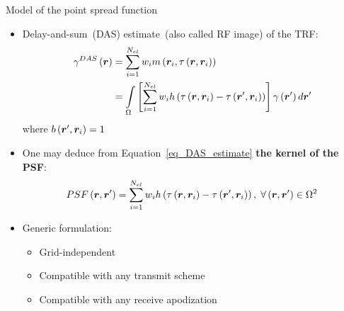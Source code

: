 {\begin{block}{Model of the point spread function}
	\begin{itemize}
		\item Delay-and-sum~(DAS) estimate~(also called RF image) of the TRF:
		\begin{align}
		\label{eq_DAS_estimate}
			\gamma^{DAS} \left(\bm{r}\right) &= \sum \limits_{i=1}^{N_{el}} w_i m \left(\bm{r}_i, \tau \left(\bm{r}, \bm{r}_i\right)\right) \nonumber \\
			&= \int \limits_{\Omega} \left[\sum \limits_{i=1}^{N_{el}} w_i h \left(\tau \left(\bm{r}, \bm{r}_i\right) - \tau \left(\bm{r}', \bm{r}_i\right) \right)\right] \gamma\left(\bm{r}'\right) d \bm{r}'
		\end{align}
		where $b \left(\bm{r}', \bm{r}_i\right) = 1$
		\item One may deduce from Equation~\eqref{eq_DAS_estimate} \textbf{the kernel of the PSF}:
		\begin{equation}
			\label{eq_PSF_estimate}
			PSF \left(\bm{r}, \bm{r}'\right) = \sum \limits_{i=1}^{N_{el}} w_i h \left(\tau \left(\bm{r}, \bm{r}_i\right) - \tau \left(\bm{r}', \bm{r}_i\right) \right), \; \forall \left(\bm{r}, \bm{r}'\right) \in \Omega^2
		\end{equation}
		\item Generic formulation:
		\begin{itemize}
			\item Grid-independent
			\item Compatible with any transmit scheme
			\item Compatible with any receive apodization 
		\end{itemize}
	\end{itemize}
\end{block}
\vfill


}
